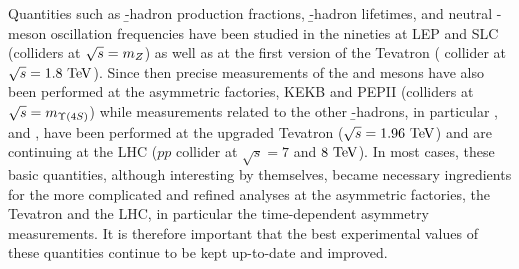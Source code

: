 %
%
%
%

%







Quantities such as \b-hadron production fractions, \b-hadron lifetimes, 
and neutral \B-meson oscillation frequencies have been studied
in the nineties at LEP and SLC %
(\ee colliders at $\sqrt{s}=m_{Z}$) 
as well as at the 
first version of the Tevatron
( collider at $\sqrt{s}=1.8~\rm TeV$). 
Since then 
precise measurements of the \Bd and \Bu mesons
have also been performed at the 
asymmetric \B factories, KEKB and PEPII
(\ee colliders at $\sqrt{s}=m_{\Upsilon(4S)}$) while measurements related 
to the other \b-hadrons, in particular \Bs, \Bc and \Lb, 
have been performed at the upgraded Tevatron ($\sqrt{s}=1.96~\rm TeV$)
and are continuing at the LHC ($pp$ collider at $\sqrt{s}=7$ and $8~\rm TeV$).
In most cases, these basic quantities, although interesting by themselves,
became necessary ingredients for the more complicated and 
refined analyses at the asymmetric \B factories, 
the Tevatron and the LHC,
in particular the time-dependent \CP asymmetry measurements.
It is therefore important that the best experimental
values of these quantities continue to be kept up-to-date and improved. 

